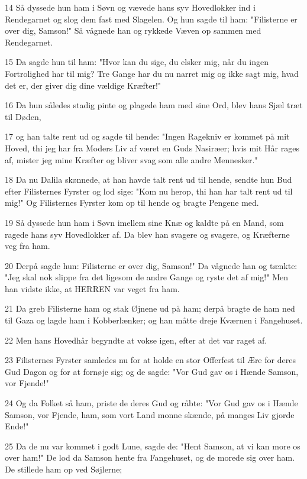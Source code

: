 \par 14 Så dyssede hun ham i Søvn og vævede hans syv Hovedlokker ind i Rendegarnet og slog dem fast med Slagelen. Og hun sagde til ham: "Filisterne er over dig, Samson!" Så vågnede han og rykkede Væven op sammen med Rendegarnet.
\par 15 Da sagde hun til ham: "Hvor kan du sige, du elsker mig, når du ingen Fortrolighed har til mig? Tre Gange har du nu narret mig og ikke sagt mig, hvad det er, der giver dig dine vældige Kræfter!"
\par 16 Da hun således stadig pinte og plagede ham med sine Ord, blev hans Sjæl træt til Døden,
\par 17 og han talte rent ud og sagde til hende: "Ingen Ragekniv er kommet på mit Hoved, thi jeg har fra Moders Liv af været en Guds Nasiræer; hvis mit Hår rages af, mister jeg mine Kræfter og bliver svag som alle andre Mennesker."
\par 18 Da nu Dalila skønnede, at han havde talt rent ud til hende, sendte hun Bud efter Filisternes Fyrster og lod sige: "Kom nu herop, thi han har talt rent ud til mig!" Og Filisternes Fyrster kom op til hende og bragte Pengene med.
\par 19 Så dyssede hun ham i Søvn imellem sine Knæ og kaldte på en Mand, som ragede hans syv Hovedlokker af. Da blev han svagere og svagere, og Kræfterne veg fra ham.
\par 20 Derpå sagde hun: Filisterne er over dig, Samson!" Da vågnede han og tænkte: "Jeg skal nok slippe fra det ligesom de andre Gange og ryste det af mig!" Men han vidste ikke, at HERREN var veget fra ham.
\par 21 Da greb Filisterne ham og stak Øjnene ud på ham; derpå bragte de ham ned til Gaza og lagde ham i Kobberlænker; og han måtte dreje Kværnen i Fangehuset.
\par 22 Men hans Hovedhår begyndte at vokse igen, efter at det var raget af.
\par 23 Filisternes Fyrster samledes nu for at holde en stor Offerfest til Ære for deres Gud Dagon og for at fornøje sig; og de sagde: "Vor Gud gav os i Hænde Samson, vor Fjende!"
\par 24 Og da Folket så ham, priste de deres Gud og råbte: "Vor Gud gav os i Hænde Samson, vor Fjende, ham, som vort Land monne skænde, på manges Liv gjorde Ende!"
\par 25 Da de nu var kommet i godt Lune, sagde de: "Hent Samson, at vi kan more os over ham!" De lod da Samson hente fra Fangehuset, og de morede sig over ham. De stillede ham op ved Søjlerne;
